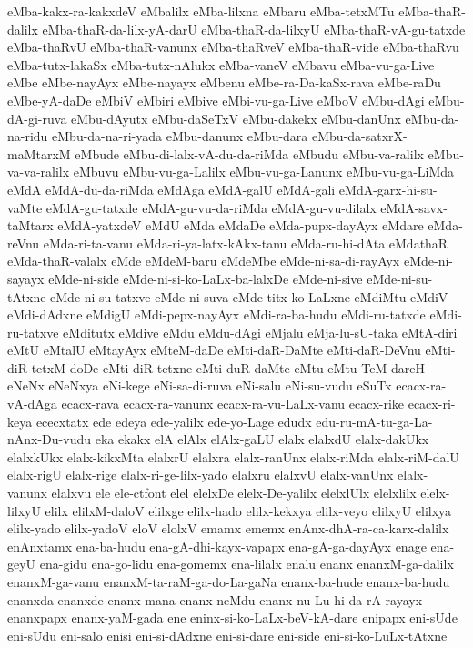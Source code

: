 {eMba-kakx-ra-kakxdeV
eMbalilx
eMba-lilxna
eMbaru
eMba-tetxMTu
eMba-thaR-dalilx
eMba-thaR-da-lilx-yA-darU
eMba-thaR-da-lilxyU
eMba-thaR-vA-gu-tatxde
eMba-thaRvU
eMba-thaR-vanunx
eMba-thaRveV
eMba-thaR-vide
eMba-thaRvu
eMba-tutx-lakaSx
eMba-tutx-nAlukx
eMba-vaneV
eMbavu
eMba-vu-ga-Live
eMbe
eMbe-nayAyx
eMbe-nayayx
eMbenu
eMbe-ra-Da-kaSx-rava
eMbe-raDu
eMbe-yA-daDe
eMbiV
eMbiri
eMbive
eMbi-vu-ga-Live
eMboV
eMbu-dAgi
eMbu-dA-gi-ruva
eMbu-dAyutx
eMbu-daSeTxV
eMbu-dakekx
eMbu-danUnx
eMbu-da-na-ridu
eMbu-da-na-ri-yada
eMbu-danunx
eMbu-dara
eMbu-da-satxrX-maMtarxM
eMbude
eMbu-di-lalx-vA-du-da-riMda
eMbudu
eMbu-va-ralilx
eMbu-va-va-ralilx
eMbuvu
eMbu-vu-ga-Lalilx
eMbu-vu-ga-Lanunx
eMbu-vu-ga-LiMda
eMdA
eMdA-du-da-riMda
eMdAga
eMdA-galU
eMdA-gali
eMdA-garx-hi-su-vaMte
eMdA-gu-tatxde
eMdA-gu-vu-da-riMda
eMdA-gu-vu-dilalx
eMdA-savx-taMtarx
eMdA-yatxdeV
eMdU
eMda
eMdaDe
eMda-pupx-dayAyx
eMdare
eMda-reVnu
eMda-ri-ta-vanu
eMda-ri-ya-latx-kAkx-tanu
eMda-ru-hi-dAta
eMdathaR
eMda-thaR-valalx
eMde
eMdeM-baru
eMdeMbe
eMde-ni-sa-di-rayAyx
eMde-ni-sayayx
eMde-ni-side
eMde-ni-si-ko-LaLx-ba-lalxDe
eMde-ni-sive
eMde-ni-su-tAtxne
eMde-ni-su-tatxve
eMde-ni-suva
eMde-titx-ko-LaLxne
eMdiMtu
eMdiV
eMdi-dAdxne
eMdigU
eMdi-pepx-nayAyx
eMdi-ra-ba-hudu
eMdi-ru-tatxde
eMdi-ru-tatxve
eMditutx
eMdive
eMdu
eMdu-dAgi
eMjalu
eMja-lu-sU-taka
eMtA-diri
eMtU
eMtalU
eMtayAyx
eMteM-daDe
eMti-daR-DaMte
eMti-daR-DeVnu
eMti-diR-tetxM-doDe
eMti-diR-tetxne
eMti-duR-daMte
eMtu
eMtu-TeM-dareH
eNeNx
eNeNxya
eNi-kege
eNi-sa-di-ruva
eNi-salu
eNi-su-vudu
eSuTx
ecacx-ra-vA-dAga
ecacx-rava
ecacx-ra-vanunx
ecacx-ra-vu-LaLx-vanu
ecacx-rike
ecacx-ri-keya
ececxtatx
ede
edeya
ede-yalilx
ede-yo-Lage
edudx
edu-ru-mA-tu-ga-La-nAnx-Du-vudu
eka
ekakx
elA
elAlx
elAlx-gaLU
elalx
elalxdU
elalx-dakUkx
elalxkUkx
elalx-kikxMta
elalxrU
elalxra
elalx-ranUnx
elalx-riMda
elalx-riM-dalU
elalx-rigU
elalx-rige
elalx-ri-ge-lilx-yado
elalxru
elalxvU
elalx-vanUnx
elalx-vanunx
elalxvu
ele
ele-ctfont
elel
elelxDe
elelx-De-yalilx
elelxlUlx
elelxlilx
elelx-lilxyU
elilx
elilxM-daloV
elilxge
elilx-hado
elilx-kekxya
elilx-veyo
elilxyU
elilxya
elilx-yado
elilx-yadoV
eloV
elolxV
emamx
ememx
enAnx-dhA-ra-ca-karx-dalilx
enAnxtamx
ena-ba-hudu
ena-gA-dhi-kayx-vapapx
ena-gA-ga-dayAyx
enage
ena-geyU
ena-gidu
ena-go-lidu
ena-gomemx
ena-lilalx
enalu
enanx
enanxM-ga-dalilx
enanxM-ga-vanu
enanxM-ta-raM-ga-do-La-gaNa
enanx-ba-hude
enanx-ba-hudu
enanxda
enanxde
enanx-mana
enanx-neMdu
enanx-nu-Lu-hi-da-rA-rayayx
enanxpapx
enanx-yaM-gada
ene
eninx-si-ko-LaLx-beV-kA-dare
enipapx
eni-sUde
eni-sUdu
eni-salo
enisi
eni-si-dAdxne
eni-si-dare
eni-side
eni-si-ko-LuLx-tAtxne
}
